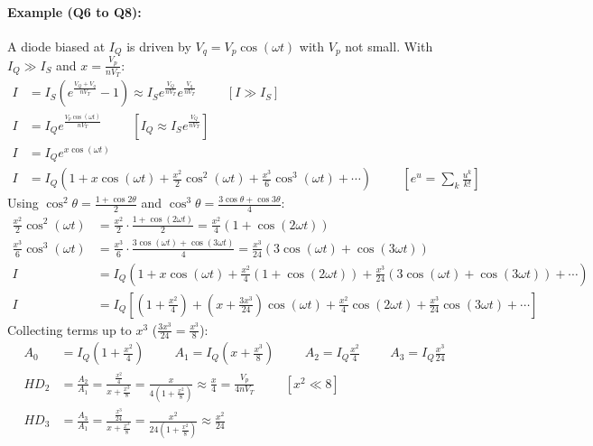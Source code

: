 \paragraph{Example (Q6 to Q8):} A diode biased at \(I_Q\) is driven by
\(V_q = V_p \cos(\omega t)\) with \(V_p\) not small. With
\(I_Q \gg I_S\) and \(x = \frac{V_p}{nV_T}\):
\begin{align*}
  I &= I_S\left(e^{\frac{V_Q + V_q}{nV_T}} - 1\right) \approx I_S e^{\frac{V_Q}{nV_T}} e^{\frac{V_q}{nV_T}} \hspace{1cm} [I \gg I_S] \\
  I &= I_Q e^{\frac{V_p \cos(\omega t)}{nV_T}} \hspace{1cm} \left[I_Q \approx I_S e^{\frac{V_Q}{nV_T}}\right] \\
  I &= I_Q e^{x \cos(\omega t)} \\
  I &= I_Q \left(1 + x\cos(\omega t) + \frac{x^2}{2}\cos^2(\omega t) + \frac{x^3}{6}\cos^3(\omega t) + \cdots \right) \hspace{1cm} \left[e^u = \sum_{k} \frac{u^k}{k!}\right]
\end{align*}
Using \(\cos^2\theta = \frac{1 + \cos 2\theta}{2}\) and
\(\cos^3\theta = \frac{3\cos\theta + \cos 3\theta}{4}\):
\begin{align*}
  \frac{x^2}{2}\cos^2(\omega t) &= \frac{x^2}{2} \cdot \frac{1 + \cos(2\omega t)}{2} = \frac{x^2}{4}\left(1 + \cos(2\omega t)\right) \\
  \frac{x^3}{6}\cos^3(\omega t) &= \frac{x^3}{6} \cdot \frac{3\cos(\omega t) + \cos(3\omega t)}{4} = \frac{x^3}{24}\left(3\cos(\omega t) + \cos(3\omega t)\right) \\
  I &= I_Q \left(1 + x\cos(\omega t) + \frac{x^2}{4}\left(1 + \cos(2\omega t)\right) + \frac{x^3}{24}\left(3\cos(\omega t) + \cos(3\omega t)\right) + \cdots \right) \\
  I &= I_Q \left[\left(1 + \frac{x^2}{4}\right) + \left(x + \frac{3x^3}{24}\right)\cos(\omega t) + \frac{x^2}{4}\cos(2\omega t) + \frac{x^3}{24}\cos(3\omega t) + \cdots \right]
\end{align*}
Collecting terms up to \(x^3\) (\(\frac{3x^3}{24} = \frac{x^3}{8}\)):
\begin{align*}
  A_0 &= I_Q\left(1 + \frac{x^2}{4}\right) \hspace{1cm}
  A_1 = I_Q\left(x + \frac{x^3}{8}\right) \hspace{1cm}
  A_2 = I_Q\frac{x^2}{4} \hspace{1cm}
  A_3 = I_Q\frac{x^3}{24} \\
  HD_2 &= \frac{A_2}{A_1} = \frac{\frac{x^2}{4}}{x + \frac{x^3}{8}} = \frac{x}{4\left(1 + \frac{x^2}{8}\right)} \approx \frac{x}{4} = \frac{V_p}{4nV_T} \hspace{1cm} [x^2 \ll 8] \\
  HD_3 &= \frac{A_3}{A_1} = \frac{\frac{x^3}{24}}{x + \frac{x^3}{8}} = \frac{x^2}{24\left(1 + \frac{x^2}{8}\right)} \approx \frac{x^2}{24}
\end{align*}
